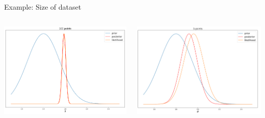 \documentclass[12pt, aspectratio=149]{beamer}
\theoremstyle{plain}
\begin{document}
\begin{frame}[fragile]{Example: Size of dataset}
\begin{columns}
        \begin{center}
             \includegraphics[scale=0.43]{figs/linreg_likelihood_posterior_N100_example.png} 
        \end{center}
        \begin{center}
            \includegraphics[scale=0.43]{figs/linreg_likelihood_posterior_N5_example.png}
        \end{center}
\end{columns}

\end{frame}
\end{document}
